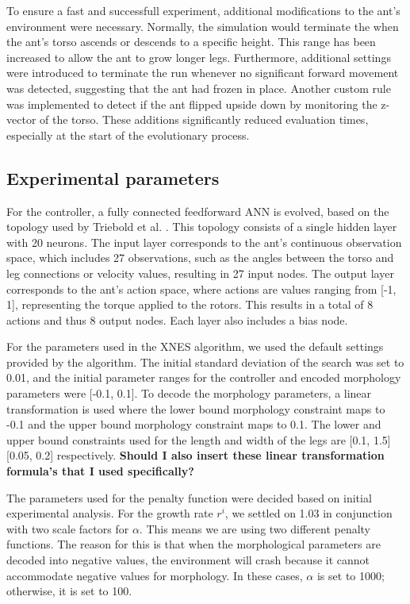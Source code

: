         To ensure a fast and successfull experiment, additional modifications to the ant's environment were necessary. Normally, the simulation would terminate the when the ant's torso ascends or descends to a specific height. This range has been increased to allow the ant to grow longer legs. Furthermore, additional settings were introduced to terminate the run whenever no significant forward movement was detected, suggesting that the ant had frozen in place. Another custom rule was implemented to detect if the ant flipped upside down by monitoring the z-vector of the torso. These additions significantly reduced evaluation times, especially at the start of the evolutionary process.

    \subsection{Experimental parameters}
        For the controller, a fully connected feedforward ANN is evolved, based on the topology used by Triebold et al. \cite{Corinna_Triebold}. This topology consists of a single hidden layer with 20 neurons. The input layer corresponds to the ant's continuous observation space, which includes 27 observations, such as the angles between the torso and leg connections or velocity values, resulting in 27 input nodes. The output layer corresponds to the ant's action space, where actions are values ranging from [-1, 1], representing the torque applied to the rotors. This results in a total of 8 actions and thus 8 output nodes. Each layer also includes a bias node.
        
        For the parameters used in the XNES algorithm, we used the default settings provided by the algorithm. The initial standard deviation of the search was set to 0.01, and the initial parameter ranges for the controller and encoded morphology parameters were [-0.1, 0.1]. To decode the morphology parameters, a linear transformation is used where the lower bound morphology constraint maps to -0.1 and the upper bound morphology constraint maps to 0.1. The lower and upper bound constraints used for the length and width of the legs are [0.1, 1.5] [0.05, 0.2] respectively. \textbf{Should I also insert these linear transformation formula's that I used specifically?}
        
        The parameters used for the penalty function were decided based on initial experimental analysis. For the growth rate $r^i$, we settled on 1.03 in conjunction with two scale factors for $\alpha$. This means we are using two different penalty functions. The reason for this is that when the morphological parameters are decoded into negative values, the environment will crash because it cannot accommodate negative values for morphology. In these cases, $\alpha$ is set to 1000; otherwise, it is set to 100.
        
